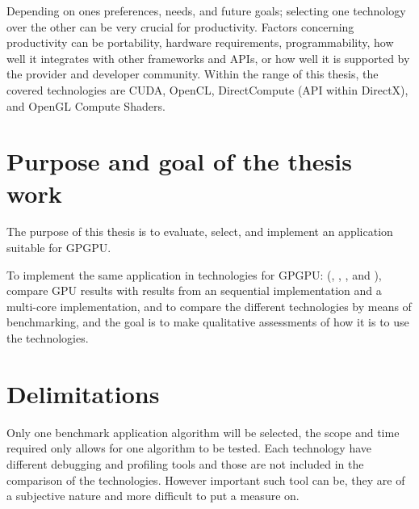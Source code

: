 Depending on ones preferences, needs, and future goals; selecting one technology over the other can be very crucial for productivity. Factors concerning productivity can be portability, hardware requirements, programmability, how well it integrates with other frameworks and \gls{API}s, or how well it is supported by the provider and developer community. Within the range of this thesis, the covered technologies are \gls{CUDA}, \gls{OpenCL}, DirectCompute (\gls{API} within DirectX), and \gls{OpenGL} Compute Shaders.

\section{Purpose and goal of the thesis work}
The purpose of this thesis is to evaluate, select, and implement an application suitable for \gls{GPGPU}.

To implement the same application in technologies for \gls{GPGPU}: ({\CU}, {\OCL}, {\DX}, and {\GL}), compare \gls{GPU} results with results from an sequential {\CPP} implementation and a multi-core {\OMP} implementation, and to compare the different technologies by means of benchmarking, and the goal is to make qualitative assessments of how it is to use the technologies.

\section{Delimitations}
Only one benchmark application algorithm will be selected, the scope and time required only allows for one algorithm to be tested. Each technology have different debugging and profiling tools and those are not included in the comparison of the technologies. However important such tool can be, they are of a subjective nature and more difficult to put a measure on.